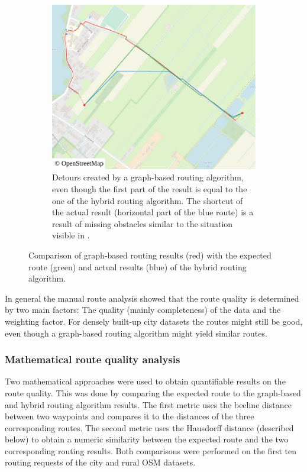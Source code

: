 \begin{figure}[h!]
\begin{minipage}[t]{.48\textwidth}
\begin{subfigure}[t]{\linewidth}
						\includegraphics[width=\textwidth]{images/qgis-routing-rural-routing-17-graph-based}
						\caption{Detours created by a graph-based routing algorithm, even though the first part of the result is equal to the one of the hybrid routing algorithm. The shortcut of the actual result (horizontal part of the blue route) is a result of missing obstacles similar to the situation visible in .}
						\label{fig:eval-rural-graph-based-comparison-17}
					\end{subfigure}
				\end{minipage}
				\caption[Visualization of detour of graph-based routes.]{Comparison of graph-based routing results (red) with the expected route (green) and actual results (blue) of the hybrid routing algorithm.}
				\label{fig:eval-rural-graph-based-comparison}
			\end{figure}
			
			In general the manual route analysis showed that the route quality is determined by two main factors:
			The quality (mainly completeness) of the data and the weighting factor.
			For densely built-up city datasets the routes might still be good, even though a graph-based routing algorithm might yield similar routes.
		
		\subsubsection{Mathematical route quality analysis}
		
			Two mathematical approaches were used to obtain quantifiable results on the route quality.
			This was done by comparing the expected route to the graph-based and hybrid routing algorithm results.
			The first metric uses the beeline distance between two waypoints and compares it to the distances of the three corresponding routes.
			The second metric uses the Hausdorff distance (described below) to obtain a numeric similarity between the expected route and the two corresponding routing results.
			Both comparisons were performed on the first ten routing requests of the city and rural OSM datasets.
			
